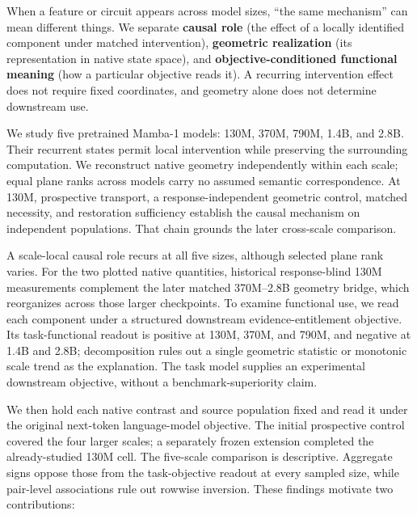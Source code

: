 \documentclass{article}
\begin{document}
When a feature or circuit appears across model sizes, ``the same mechanism'' can mean different things. We separate \textbf{causal role} (the effect of a locally identified component under matched intervention), \textbf{geometric realization} (its representation in native state space), and \textbf{objective-conditioned functional meaning} (how a particular objective reads it). A recurring intervention effect does not require fixed coordinates, and geometry alone does not determine downstream use.

We study five pretrained Mamba-1 models: 130M, 370M, 790M, 1.4B, and 2.8B. Their recurrent states permit local intervention while preserving the surrounding computation. We reconstruct native geometry independently within each scale; equal plane ranks across models carry no assumed semantic correspondence. At 130M, prospective transport, a response-independent geometric control, matched necessity, and restoration sufficiency establish the causal mechanism on independent populations. That chain grounds the later cross-scale comparison.

A scale-local causal role recurs at all five sizes, although selected plane rank varies. For the two plotted native quantities, historical response-blind 130M measurements complement the later matched 370M--2.8B geometry bridge, which reorganizes across those larger checkpoints. To examine functional use, we read each component under a structured downstream evidence-entitlement objective. Its task-functional readout is positive at 130M, 370M, and 790M, and negative at 1.4B and 2.8B; decomposition rules out a single geometric statistic or monotonic scale trend as the explanation. The task model supplies an experimental downstream objective, without a benchmark-superiority claim.

We then hold each native contrast and source population fixed and read it under the original next-token language-model objective. The initial prospective control covered the four larger scales; a separately frozen extension completed the already-studied 130M cell. The five-scale comparison is descriptive. Aggregate signs oppose those from the task-objective readout at every sampled size, while pair-level associations rule out rowwise inversion. These findings motivate two contributions:
\end{document}
